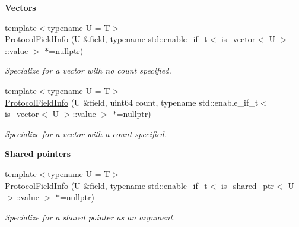 \begin{Indent}\textbf{ Vectors}\par
\begin{DoxyCompactItemize}
\item 
\mbox{\label{structrev_1_1_protocol_field_info_a4d5b3c8b49f2c47fbc1d6178f23ea507}} 
{\footnotesize template$<$typename U  = T$>$ }\\\mbox{\hyperlink{structrev_1_1_protocol_field_info_a4d5b3c8b49f2c47fbc1d6178f23ea507}{Protocol\+Field\+Info}} (U \&field, typename std\+::enable\+\_\+if\+\_\+t$<$ \mbox{\hyperlink{structrev_1_1is__vector}{is\+\_\+vector}}$<$ U $>$\+::value $>$ $\ast$=nullptr)
\begin{DoxyCompactList}\small\item\em Specialize for a vector with no count specified. \end{DoxyCompactList}\item 
\mbox{\label{structrev_1_1_protocol_field_info_af4d3fb4f0c83ddfcd7e4c6c9b1199c36}} 
{\footnotesize template$<$typename U  = T$>$ }\\\mbox{\hyperlink{structrev_1_1_protocol_field_info_af4d3fb4f0c83ddfcd7e4c6c9b1199c36}{Protocol\+Field\+Info}} (U \&field, uint64 count, typename std\+::enable\+\_\+if\+\_\+t$<$ \mbox{\hyperlink{structrev_1_1is__vector}{is\+\_\+vector}}$<$ U $>$\+::value $>$ $\ast$=nullptr)
\begin{DoxyCompactList}\small\item\em Specialize for a vector with a count specified. \end{DoxyCompactList}\end{DoxyCompactItemize}
\end{Indent}
\begin{Indent}\textbf{ Shared pointers}\par
\begin{DoxyCompactItemize}
\item 
\mbox{\label{structrev_1_1_protocol_field_info_a65b4a990b270207f3af1e3cf8f85980e}} 
{\footnotesize template$<$typename U  = T$>$ }\\\mbox{\hyperlink{structrev_1_1_protocol_field_info_a65b4a990b270207f3af1e3cf8f85980e}{Protocol\+Field\+Info}} (U \&field, typename std\+::enable\+\_\+if\+\_\+t$<$ \mbox{\hyperlink{structrev_1_1is__shared__ptr}{is\+\_\+shared\+\_\+ptr}}$<$ U $>$\+::value $>$ $\ast$=nullptr)
\begin{DoxyCompactList}\small\item\em Specialize for a shared pointer as an argument. \end{DoxyCompactList}\end{DoxyCompactItemize}
\end{Indent}
